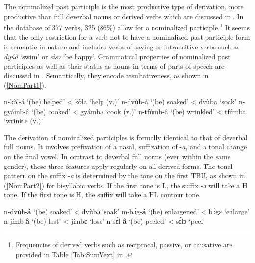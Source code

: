 The nominalized past participle is the most productive type of derivation, more productive than  full deverbal nouns or derived verbs which are discussed in . In the database of 377 verbs, 325 (86\%) allow for a nominalized participle.\footnote{Frequencies of derived verbs such as reciprocal, passive, or causative are provided in Table \ref{Tab:SumVext} in .} It seems that the only restriction for a verb not to have a nominalized past participle form is semantic in nature and includes verbs of saying or intransitive verbs such as {\itshape dyúà} `swim' or {\itshape sìsɔ} `be happy'. Grammatical properties of nominalized past participles as well as their status as nouns in terms of parts of speech are discussed in . Semantically, they encode resultativeness, as shown in (\ref{NomPart1}).

\begin{exe}
\ex\label{NomPart1} 
\begin{xlist}
\ex n-kòl-á `(be) helped' < kòla `help (v.)'
\ex n-dvùb-á `(be) soaked' < dvùba `soak'
\ex n-gyámb-â `(be) cooked' < gyámbɔ `cook (v.)'
\ex  n-tfúmb-â `(be) wrinkled' < tfúmba `wrinkle (v.)'
\end{xlist}
\end{exe}



The derivation of nominalized participles is formally identical to that of deverbal full nouns. It involves prefixation of a nasal, suffixation of -{\itshape a}, and a tonal change on the final vowel. In contrast to deverbal full nouns (even within the same gender), these three features apply regularly on all derived forms. The tonal pattern on the suffix -{\itshape a} is determined by the tone on the first TBU, as shown in (\ref{NomPart2}) for bisyllabic verbs. If the first tone is L, the  suffix -{\itshape a} will take a H tone. If the first tone is H, the suffix will take a HL contour tone.

\begin{exe}
\ex\label{NomPart2} 
\begin{xlist}
\ex n-dvùb-{\bfseries á} `(be) soaked' < dvùbɔ `soak'
\ex m-bɔ̀g-{\bfseries á} `(be) enlargened' < bɔ̀gɛ `enlarge'
\ex n-jímb-{\bfseries â} `(be) lost' < jímbɛ `lose'
\ex n-sɛ́l-{\bfseries â} `(be) peeled' < sɛ́lɔ `peel'
\end{xlist}
\end{exe}

